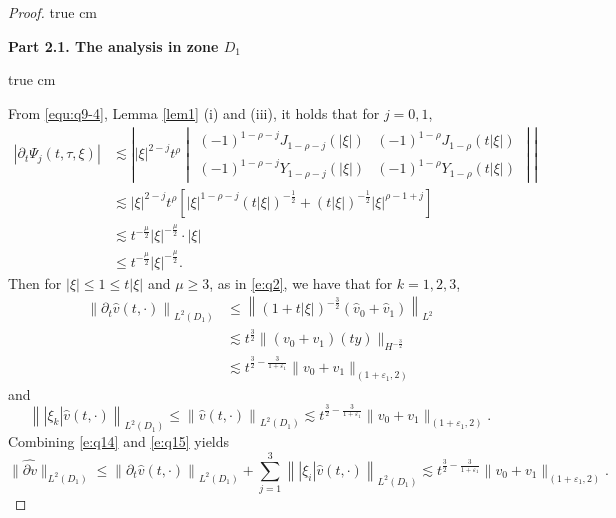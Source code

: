 \documentclass[10pt,a4paper]{amsart}
\newcommand{\f}{\frac}
\newcommand{\p}{\partial}
\begin{document}
\begin{proof}
 true cm

{\bf Part 2.1.  The analysis  in zone $D_1$}

 true cm

From \eqref{equ:q9-4}, Lemma \ref{lem1} (i) and (iii), it holds that for $j=0,1$,
\begin{equation}\label{e:q13}
\begin{aligned}
|\p_t\Psi_j(t,\tau,\xi)|
&\lesssim\left| |\xi|^{2-j} t^{\rho}
\begin{vmatrix}
(-1)^{1-\rho-j}J_{1-\rho-j}(|\xi|) & (-1)^{1-\rho}J_{1-\rho}(t|\xi|) \\
(-1)^{1-\rho-j}Y_{1-\rho-j}(|\xi|) & (-1)^{1-\rho}Y_{1-\rho}(t|\xi|)
\end{vmatrix} \right|\\
&\lesssim |\xi|^{2-j} t^{\rho}\left[|\xi|^{1-\rho-j}(t|\xi|)^{-\f12}+(t|\xi|)^{-\f12}|\xi|^{\rho-1+j}\right]\\
&\lesssim t^{-\f{\mu}{2}}|\xi|^{-\f{\mu}{2}}\cdot|\xi|\\
&\leq t^{-\f{\mu}{2}}|\xi|^{-\f{\mu}{2}}.
\end{aligned}
\end{equation}
Then for $|\xi| \leq 1\leq t|\xi|$ and $\mu\geq3$, as in \eqref{e:q2}, we have that for $k=1, 2, 3$,
\begin{equation}\label{e:q14}
\begin{aligned}
\left\|\p_t\hat{v}(t, \cdot)\right\|_{L^2(D_1)} & \leq\left\|(1+t|\xi|)^{-\f32}(\hat{v}_{0}+\hat{v}_{1})\right\|_{L^{2}} \\
& \lesssim t^{\f32}\|(v_0+v_1)(ty)\|_{H^{-\f32}}\\
& \lesssim t^{\f32-\f{3}{1+\varepsilon_1}}\|v_0+v_1\|_{(1+\varepsilon_1, 2)}
\end{aligned}
\end{equation}
and
\begin{equation}\label{e:q15}
\left\||\xi_k|\hat{v}(t, \cdot)\right\|_{L^2(D_1)}\leq\left\|\hat{v}(t, \cdot)\right\|_{L^2(D_1)}
\lesssim  t^{\f32-\f{3}{1+\varepsilon_1}}\|v_0+v_1\|_{(1+\varepsilon_1, 2)}.
\end{equation}
Combining  \eqref{e:q14} and \eqref{e:q15} yields
\begin{equation}\label{e:q16}
\|\widehat{\p v}\|_{L^2(D_1)}\leq \left\|\p_t\hat{v}(t, \cdot)\right\|_{L^2(D_1)}+\sum_{j=1}^{3}\left\||\xi_i|\hat{v}(t, \cdot)\right\|_{L^2(D_1)} \lesssim t^{\f32-\f{3}{1+\varepsilon_1}}\|v_0+v_1\|_{(1+\varepsilon_1, 2)}.
\end{equation}


\end{proof}
\end{document}
